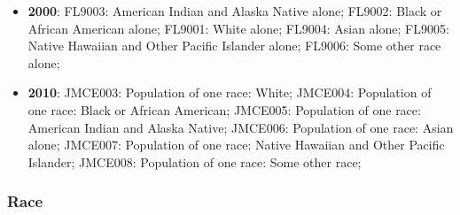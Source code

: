 \documentclass[a4paper]{article}
\begin{document}
\begin{itemize}
   \item{\textbf{2000}:  FL9003: American Indian and Alaska Native alone; FL9002: Black or African American alone; FL9001: White alone; FL9004: Asian alone; FL9005: Native Hawaiian and Other Pacific Islander alone; FL9006: Some other race alone;}
   \item{\textbf{2010}:  JMCE003: Population of one race: White; JMCE004: Population of one race: Black or African American; JMCE005: Population of one race: American Indian and Alaska Native; JMCE006: Population of one race: Asian alone; JMCE007: Population of one race: Native Hawaiian and Other Pacific Islander; JMCE008: Population of one race: Some other race;}
\end{itemize}

\subsubsection{Race}
\end{document}
